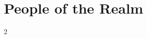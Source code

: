 \section*{\centering \fontsize{35}{45}\selectfont People of the Realm}
\vspace*{0.4 cm}

\begin{multicols*}{2}

\

    
\end{multicols*}